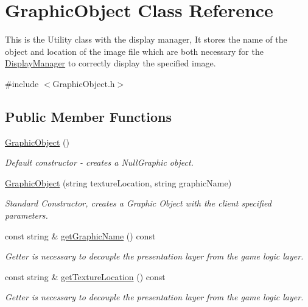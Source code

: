 \hypertarget{class_graphic_object}{}\section{Graphic\+Object Class Reference}
\label{class_graphic_object}


This is the Utility class with the display manager, It stores the name of the object and location of the image file which are both necessary for the \hyperlink{class_display_manager}{Display\+Manager} to correctly display the specified image.  




{\ttfamily \#include $<$Graphic\+Object.\+h$>$}

\subsection*{Public Member Functions}
\begin{DoxyCompactItemize}
\item 
\hyperlink{class_graphic_object_ae1b56ae4484ad120f5ba77c0b683a045}{Graphic\+Object} ()
\begin{DoxyCompactList}\small\item\em Default constructor -\/ creates a Null\+Graphic object. \end{DoxyCompactList}\item 
\hyperlink{class_graphic_object_a9819ca0b4c1bb72ede070d8485bfc8a9}{Graphic\+Object} (string texture\+Location, string graphic\+Name)
\begin{DoxyCompactList}\small\item\em Standard Constructor, creates a Graphic Object with the client specified parameters. \end{DoxyCompactList}\item 
const string \& \hyperlink{class_graphic_object_a8772813296b837e997ee21836e92b028}{get\+Graphic\+Name} () const
\begin{DoxyCompactList}\small\item\em Getter is necessary to decouple the presentation layer from the game logic layer. \end{DoxyCompactList}\item 
const string \& \hyperlink{class_graphic_object_a1041a2dd82f82fc724675c5a2ea67d32}{get\+Texture\+Location} () const
\begin{DoxyCompactList}\small\item\em Getter is necessary to decouple the presentation layer from the game logic layer. \end{DoxyCompactList}\end{DoxyCompactItemize}
